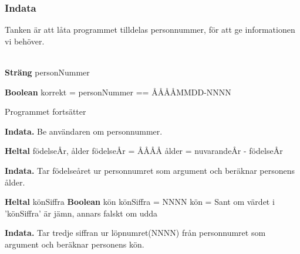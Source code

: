 \documentclass[../main.tex]{subfiles}
\begin{document}
\subsubsection{Indata}
Tanken är att låta programmet tilldelas personnummer, för att ge informationen vi behöver.\\
\\
\begin{algorithm}[H]
\SetAlgoLined


 \textbf{Sträng} personNummer\;
 
 \textbf{Boolean} korrekt = personNummer == ÅÅÅÅMMDD-NNNN \;
 
 Programmet fortsätter
 \caption{\textbf{Indata.} Be användaren om personnummer.}
 
\end{algorithm}

\begin{algorithm}[H]
\SetAlgoLined


 \textbf{Heltal} födelseÅr, ålder\;
 födelseÅr = ÅÅÅÅ\;
 ålder = nuvarandeÅr - födelseÅr\;
 \caption{\textbf{Indata.} Tar födelseåret ur personnumret som argument och beräknar personens ålder.}
\end{algorithm}

\begin{algorithm}[H]
\SetAlgoLined


 \textbf{Heltal} könSiffra\;
 \textbf{Boolean} kön\;
 könSiffra = NNNN\;
 kön = Sant om värdet i 'könSiffra' är jämn, annars falskt om udda\;
 \caption{\textbf{Indata.} Tar tredje siffran ur löpnumret(NNNN) från personnumret som argument och beräknar personens kön.}
\end{algorithm}

\newpage
\end{document}
